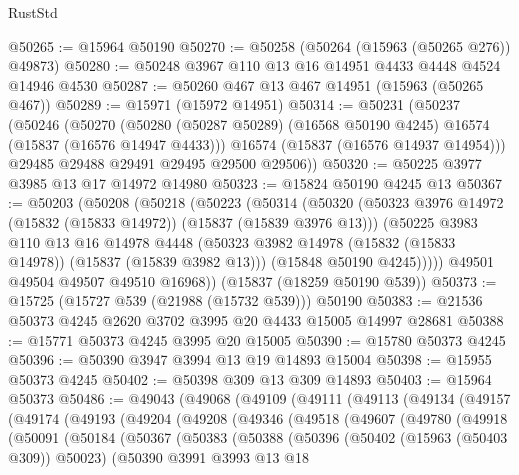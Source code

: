 \begin{lexlean}{RustStd}
\begin{coremodule}
@50265 := @15964 @50190
@50270 := @50258 (@50264 (@15963 (@50265 @276)) @49873)
@50280 := @50248 @3967 @110 @13 @16 @14951 @4433 @4448 @4524 @14946 @4530
@50287 := @50260 @467 @13 @467 @14951 (@15963 (@50265 @467))
@50289 := @15971 (@15972 @14951)
@50314 := @50231
    (@50237
      (@50246
        (@50270
          (@50280 (@50287 @50289) (@16568 @50190 @4245) @16574 (@15837 (@16576 @14947 @4433)))
          @16574
          (@15837 (@16576 @14937 @14954)))
        @29485
        @29488
        @29491
        @29495
        @29500
        @29506))
@50320 := @50225 @3977 @3985 @13 @17 @14972 @14980
@50323 := @15824 @50190 @4245 @13
@50367 := @50203
    (@50208
      (@50218
        (@50223
          (@50314
            (@50320
              (@50323 @3976 @14972 (@15832 (@15833 @14972)) (@15837 (@15839 @3976 @13)))
              (@50225
                @3983
                @110
                @13
                @16
                @14978
                @4448
                (@50323 @3982 @14978 (@15832 (@15833 @14978)) (@15837 (@15839 @3982 @13)))
                (@15848 @50190 @4245)))))
        @49501
        @49504
        @49507
        @49510
        @16968))
    (@15837 (@18259 @50190 @539))
@50373 := @15725 (@15727 @539 (@21988 (@15732 @539))) @50190
@50383 := @21536 @50373 @4245 @2620 @3702 @3995 @20 @4433 @15005 @14997 @28681
@50388 := @15771 @50373 @4245 @3995 @20 @15005
@50390 := @15780 @50373 @4245
@50396 := @50390 @3947 @3994 @13 @19 @14893 @15004
@50398 := @15955 @50373 @4245
@50402 := @50398 @309 @13 @309 @14893
@50403 := @15964 @50373
@50486 := @49043
    (@49068
      (@49109
        (@49111
          (@49113
            (@49134
              (@49157
                (@49174
                  (@49193
                    (@49204
                      (@49208
                        (@49346
                          (@49518
                            (@49607
                              (@49780
                                (@49918
                                  (@50091
                                    (@50184
                                      (@50367
                                        (@50383
                                          (@50388
                                            (@50396
                                              (@50402 (@15963 (@50403 @309)) @50023)
                                              (@50390
                                                @3991
                                                @3993
                                                @13
                                                @18

\end{coremodule}
\end{lexlean}
